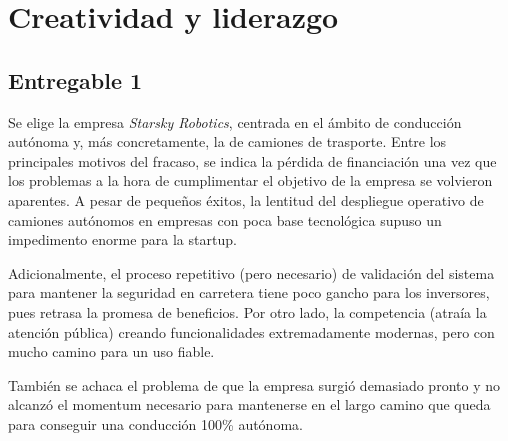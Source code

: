 \section{Creatividad y liderazgo}


\subsection{Entregable 1}

Se elige la empresa \textit{Starsky Robotics}, centrada en el ámbito de conducción autónoma y, más concretamente, la de camiones de trasporte. Entre los principales motivos del fracaso, se indica la pérdida de financiación una vez que los problemas a la hora de cumplimentar el objetivo de la empresa se volvieron aparentes. A pesar de pequeños éxitos, la lentitud del despliegue operativo de camiones autónomos en empresas con poca base tecnológica supuso un impedimento enorme para la startup.

\vspace{\baselineskip}

Adicionalmente, el proceso repetitivo (pero necesario) de validación del sistema para mantener la seguridad en carretera tiene poco gancho para los inversores, pues retrasa la promesa de beneficios. Por otro lado, la competencia (atraía la atención pública) creando funcionalidades extremadamente modernas, pero con mucho camino para un uso fiable.

\vspace{\baselineskip}

También se achaca el problema de que la empresa surgió demasiado pronto y no alcanzó el momentum necesario para mantenerse en el largo camino que queda para conseguir una conducción 100\% autónoma.


